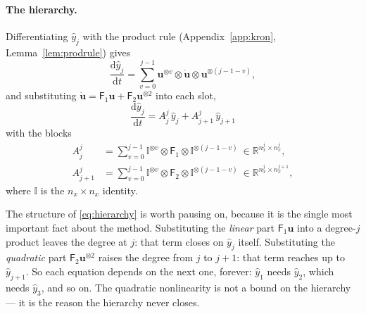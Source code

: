 \documentclass[11pt,a4paper]{article}
\theoremstyle{plain}
\theoremstyle{definition}
\theoremstyle{remark}
\newcommand{\R}{\mathbb{R}}
\newcommand{\dd}{\mathrm{d}}
\newcommand{\Id}{\mathbb{I}}
\newcommand{\uvec}{\bm{u}}
\newcommand{\Fone}{\mathsf{F}_1}
\newcommand{\Ftwo}{\mathsf{F}_2}
\begin{document}
\paragraph{The hierarchy.}  Differentiating $\hat y_j$ with the product rule
(Appendix~\ref{app:kron}, Lemma~\ref{lem:prodrule}) gives
\begin{equation}
\frac{\dd\hat y_j}{\dd t}
=\sum_{v=0}^{j-1}
\uvec^{\otimes v}\otimes\dot{\uvec}\otimes\uvec^{\otimes(j-1-v)} ,
\end{equation}
and substituting $\dot{\uvec}=\Fone\uvec+\Ftwo\uvec^{\otimes2}$ into each slot,
\begin{equation}
\boxed{\ \frac{\dd\hat y_j}{\dd t}= A^j_j\,\hat y_j + A^j_{j+1}\,\hat y_{j+1}\ }
\label{eq:hierarchy}
\end{equation}
with the blocks \cite[Eqs.~(E.4)--(E.5)]{Setty2026}
\begin{align}
A^j_j &= \sum_{v=0}^{j-1}
\Id^{\otimes v}\otimes\Fone\otimes\Id^{\otimes(j-1-v)}
\ \in\R^{n_x^j\times n_x^j},
\label{eq:Ajj}\\
A^j_{j+1} &= \sum_{v=0}^{j-1}
\Id^{\otimes v}\otimes\Ftwo\otimes\Id^{\otimes(j-1-v)}
\ \in\R^{n_x^j\times n_x^{j+1}},
\label{eq:Ajj1}
\end{align}
where $\Id$ is the $n_x\times n_x$ identity.

The structure of \eqref{eq:hierarchy} is worth pausing on, because it is the
single most important fact about the method.  Substituting the \emph{linear}
part $\Fone\uvec$ into a degree-$j$ product leaves the degree at $j$: that term
closes on $\hat y_j$ itself.  Substituting the \emph{quadratic} part
$\Ftwo\uvec^{\otimes2}$ raises the degree from $j$ to $j+1$: that term reaches
up to $\hat y_{j+1}$.  So each equation depends on the next one, forever:
$\hat y_1$ needs $\hat y_2$, which needs $\hat y_3$, and so on.  The quadratic
nonlinearity is not a bound on the hierarchy --- it is the reason the hierarchy
never closes.
\end{document}
